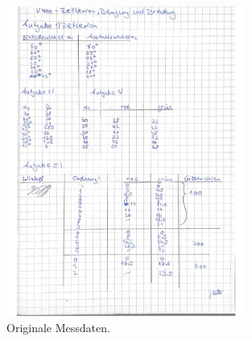 \begin{figure}[H]
  \centering
  \includegraphics[width=0.7\textwidth]{data/origDaten.jpg}
  \caption{Originale Messdaten.}
  \label{fig:origDaten1}
\end{figure}